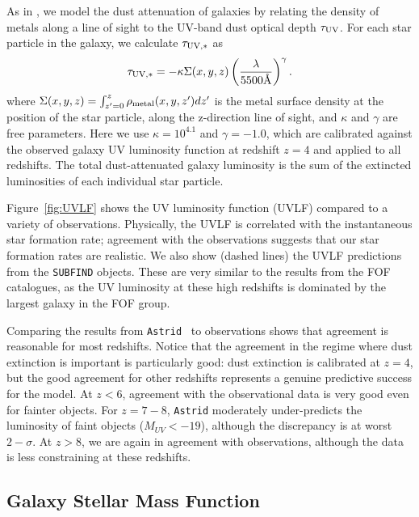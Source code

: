 \documentclass[fleqn,usenatbib]{mnras}
\def\astrid{\texttt{Astrid} }
\begin{document}
As in \citet{Wilkins2017}, we model the dust attenuation of galaxies by relating the density of metals along a line of sight to the UV-band dust optical depth $\tau_{\rm UV}$. For each star particle in the galaxy, we calculate $\tau_{\rm UV,\ast}$ as
\begin{equation}
\label{eq:dust_extinction}
 \tau_{{\rm UV,}\ast}= -\kappa \Sigma(x, y, z) \left(\frac{\lambda}{5500\text{\normalfont\AA}}\right)^{\gamma}.
\end{equation}
where $\Sigma(x, y, z) = \int_{z'=0}^{z} \rho_{\rm metal}(x,y,z')dz'$ is the metal surface density at the position of the star particle, along the z-direction line of sight, and $\kappa$ and $\gamma$ are free parameters.
Here we use $\kappa=10^{4.1}$ and $\gamma=-1.0$, which are calibrated against the observed galaxy UV luminosity function at redshift $z=4$ and applied to all redshifts.
The total dust-attenuated galaxy luminosity is the sum of the extincted luminosities of each individual star particle.

Figure~\ref{fig:UVLF} shows the UV luminosity function (UVLF) compared to a variety of observations. Physically, the UVLF is correlated with the instantaneous star formation rate; agreement with the observations suggests that our star formation rates are realistic. We also show (dashed lines) the UVLF predictions from the \texttt{SUBFIND} objects. These are very similar to the results from the FOF catalogues, as the UV luminosity at these high redshifts is dominated by the largest galaxy in the FOF group.

Comparing the results from \astrid~to observations shows that agreement is reasonable for most redshifts. Notice that the agreement in the regime where dust extinction is important is particularly good: dust extinction is calibrated at $z=4$, but the good agreement for other redshifts represents a genuine predictive success for the model. At $z < 6$, agreement with the observational data is very good even for fainter objects. For $z=7-8$, \astrid moderately under-predicts the luminosity of faint objects ($M_{UV} < -19$), although the discrepancy is at worst \citep[comparing to ][]{Bouwens2021} $2-\sigma$. At $z > 8$, we are again in agreement with observations, although the data is less constraining at these redshifts.

\subsection{Galaxy Stellar Mass Function}
\label{sec:gsmf}
\end{document}

